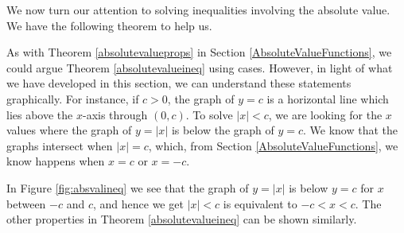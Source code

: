 We now turn our attention to solving inequalities involving the absolute value. We have the following theorem to help us.

\smallskip


\smallskip

As with Theorem \ref{absolutevalueprops} in Section \ref{AbsoluteValueFunctions}, we could argue Theorem \ref{absolutevalueineq} using cases.  However, in light of what we have developed in this section, we can understand these statements graphically.  For instance, if $c > 0$, the graph of $y=c$ is a horizontal line which lies above the $x$-axis through $(0,c)$.  To solve $|x| < c$, we are looking for the $x$ values where the graph of $y=|x|$ is below the graph of $y=c$.  We know that the graphs intersect when $|x|=c$, which, from Section \ref{AbsoluteValueFunctions}, we know happens when $x=c$ or $x=-c$.  


In Figure \ref{fig:absvalineq} we see that the graph of $y=|x|$ is below $y=c$ for $x$ between $-c$ and $c$, and hence we get $|x| < c$ is equivalent to $-c < x < c$.  The other properties in Theorem \ref{absolutevalueineq} can be shown similarly.

